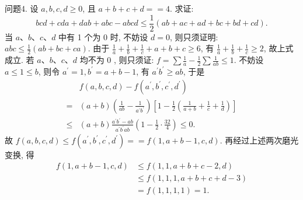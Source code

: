 问题4. 设 $a, b, c, d \geqslant 0$, 且 $a+b+c+d==4$. 求证:
$$
b c d+c d a+d a b+a b c-a b c d \leqslant \frac{1}{2}(a b+a c+a d+b c+b d+c d) .
$$
当 $a 、 b 、 c 、 d$ 中有 1 个为 0 时, 不妨设 $d=0$, 则只须证明: $a b c \leqslant \frac{1}{2}(a b+b c+c a)$. 由于 $\frac{1}{a}+\frac{1}{b}+\frac{1}{c}+a+b+c \geqslant 6$, 有 $\frac{1}{a}+\frac{1}{b}+\frac{1}{c} \geqslant 2$, 故上式成立.
若 $a 、 b 、 c 、 d$ 均不为 0 , 则只须证: $f=\sum \frac{1}{a}-\frac{1}{2} \sum \frac{1}{a b} \leqslant 1$.
不妨设 $a \leqslant 1 \leqslant b$, 则令 $a^{\prime}=1, b^{\prime}=a+b-1$, 有 $a^{\prime} b^{\prime} \geqslant a b$, 于是
$$
\begin{aligned}
& f(a, b, c, d)-f\left(a^{\prime}, b^{\prime}, c^{\prime}, d^{\prime}\right) \\
= & (a+b)\left(\frac{1}{a b}-\frac{1}{a^{\prime} b^{\prime}}\right)\left[1-\frac{1}{2}\left(\frac{1}{a+b}+\frac{1}{c}+\frac{1}{d}\right)\right] \\
\leqslant & (a+b) \frac{a^{\prime} b^{\prime}-a b}{a^{\prime} b^{\prime} a b}\left(1-\frac{1}{2} \cdot \frac{32}{4}\right) \leqslant 0 .
\end{aligned}
$$
故 $f(a, b, c, d) \leqslant f\left(a^{\prime}, b^{\prime}, c^{\prime}, d^{\prime}\right)==f(1, a+b-1, c, d)$.
再经过上述两次磨光变换, 得
$$
\begin{aligned}
f(1, a+b-1, c, d) & \leqslant f(1,1, a+b+c-2, d) \\
& \leqslant f(1,1,1, a+b+c+d-3) \\
& =f(1,1,1,1)=1 .
\end{aligned}
$$



